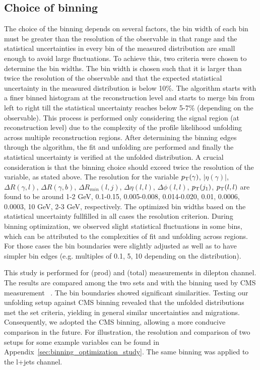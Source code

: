 \subsection{Choice of binning}
\label{sec:choice-of-binning}
The choice of the binning depends on several factors, the bin width of each bin must be greater than the resolution of the observable in that range and the statistical uncertainties in every bin of the measured distribution are small enough to avoid large fluctuations. To achieve this, two criteria were chosen to determine the bin widths. The bin width is chosen such that it is larger than twice the resolution of the observable and that the expected statistical uncertainty in the measured distribution is below 10\%. The algorithm starts with a finer binned histogram at the reconstruction level and starts to merge bin from left to right till the statistical uncertainty reaches below 5-7\% (depending on the observable). This process is performed only considering the signal region (at reconstruction level) due to the complexity of the profile likelihood unfolding across multiple reconstruction regions. After determining the binning edges through the algorithm, the fit and unfolding are performed and finally the statistical uncertainty is verified at the unfolded distribution. A crucial consideration is that the binning choice should exceed twice the resolution of the variable, as stated above. The resolution for the variable $p_{\text{T}}(\gamma)$, $|\eta(\gamma)|$, $\Delta R(\gamma,l)$, $\Delta R(\gamma,b)$, $\Delta R_{min}(l,j)$, $\Delta \eta(l,l)$, $\Delta \phi(l,l)$, $p_{\text{T}}(j_1)$, $p_{\text{T}}(l,l)$ are found to be around 1-2 GeV, 0.1-0.15, 0.005-0.008, 0.014-0.020, 0.01, 0.0006, 0.0003, 10 GeV, 2-3 GeV, respectively. The optimized bin widths based on the statistical uncertainty fullfilled in all cases the resolution criterion. During binning optimization, we observed slight statistical fluctuations in some bins, which can be attributed to the complexities of fit and unfolding across regions. For those cases the bin boundaries were slightly adjusted as well as to have simpler bin edges (e.g. multiples of 0.1, 5, 10 depending on the distribution). 

This study is performed for \tty(prod) and \tty(total) measurements in dilepton channel. The results are compared among the two sets and with the binning used by CMS measurement ~\cite{CMS2022}. The bin boundaries showed significant similarities. Testing our unfolding setup against CMS binning revealed that the unfolded distributions met the set criteria, yielding in general similar uncertainties and migrations. Consequently, we adopted the CMS binning, allowing a more conducive comparison in the future. For illustration, the resolution and comparison of two setups for some example variables can be found in Appendix~\ref{sec:binning_optimization_study}. The same binning was applied to the l+jets channel. 

